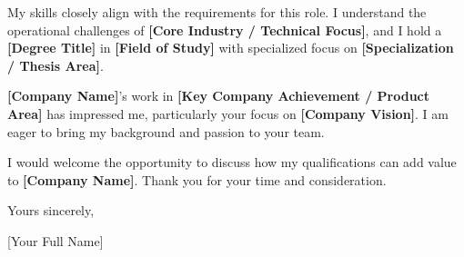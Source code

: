 \documentclass[11pt,a4paper]{article}
\newcommand{\ApplicantName}{[Your Full Name]}
\begin{document}
My skills closely align with the requirements for this role. I understand the operational challenges of \textbf{[Core Industry / Technical Focus]}, and I hold a \textbf{[Degree Title]} in \textbf{[Field of Study]} with specialized focus on \textbf{[Specialization / Thesis Area]}.

\textbf{[Company Name]}'s work in \textbf{[Key Company Achievement / Product Area]} has impressed me, particularly your focus on \textbf{[Company Vision]}. I am eager to bring my background and passion to your team.

I would welcome the opportunity to discuss how my qualifications can add value to \textbf{[Company Name]}. Thank you for your time and consideration.

\vspace{1.5em}

Yours sincerely,

\vspace{1em}

\ApplicantName
\end{document}
